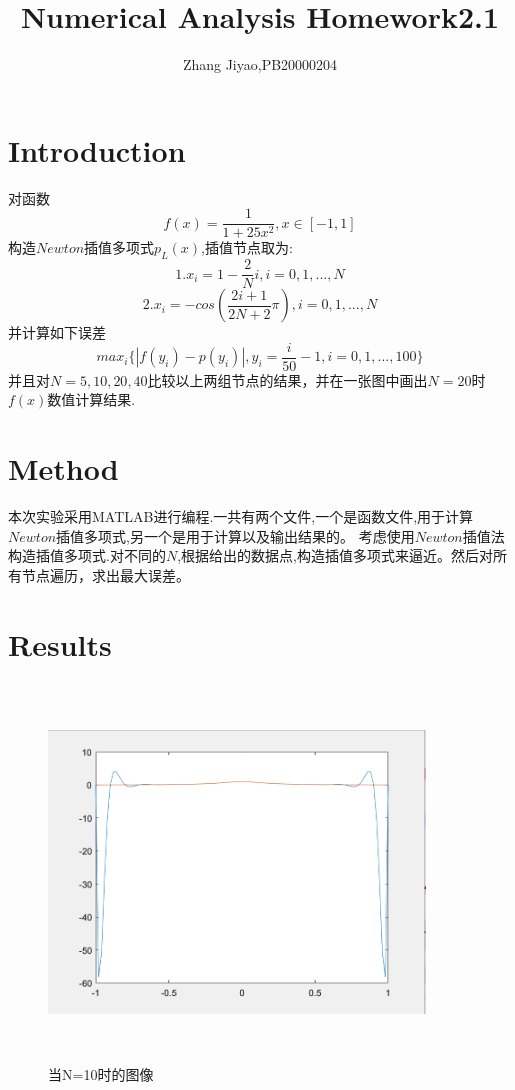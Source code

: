 \documentclass{article}
\title{Numerical Analysis Homework2.1}
\author{Zhang Jiyao,PB20000204}
\begin{document}
	\maketitle
	
	\section{Introduction}
	对函数
	$$f(x)=\frac{1}{1+25x^2},x\in [-1,1]$$
	构造$Newton$插值多项式$p_L(x)$,插值节点取为:
	$$1.x_i=1-\frac{2}{N}i,i=0,1,...,N$$
	$$2.x_i=-cos(\frac{2i+1}{2N+2}\pi),i=0,1,...,N$$
	并计算如下误差
	$$max_i\{\left|f(y_i)-p(y_i)\right|,y_i=\frac{i}{50}-1,i=0,1,...,100\}$$
	并且对$N=5,10,20,40$比较以上两组节点的结果，并在一张图中画出$N=20$时$f(x)$数值计算结果.
	
	
	\section{Method}
	本次实验采用MATLAB进行编程.一共有两个文件,一个是函数文件,用于计算$Newton$插值多项式,另一个是用于计算以及输出结果的。
	考虑使用$Newton$插值法构造插值多项式.对不同的$N$,根据给出的数据点,构造插值多项式来逼近。然后对所有节点遍历，求出最大误差。
	
	\section{Results}
	
	\begin{figure}[p]
		\begin{center}
			
			\includegraphics[width=10cm,height=10cm]{graph}
			
			\caption{当N=10时的图像} \label{figure.label}
		\end{center}
	\end{figure}
	
\end{document}
